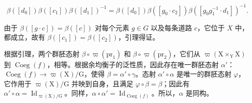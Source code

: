 \[
\beta ([ d _ {0} ]) \beta ([ c _ {1} ]) \beta ([ d _ {1} ]) ^ {- 1} = \beta ([ d _ {0} ]) \beta ([ g _ {0} \cdot c _ {2} ]) \beta ([ g _ {0} g _ {1} ^ {- 1} \cdot d _ {1} ]) ^ {- 1}.
\]

由于 \(\beta([g \cdot c]) = \beta([c])\) 对每个元素 \(g \in G\) 以及每条道路 \(c\)，它位于 \(X\) 中，都成立，故有 \(\beta([c_1]) = \beta([c_2])\)，引理得证。

根据引理，两个群胚态射 \(\beta \circ \varpi(\mathrm{pr}_{1})\) 和 \(\beta \circ \varpi(\mathrm{pr}_{2})\)，它们从 \(\varpi(\mathrm{X} \times_{\mathrm{Y}} \mathrm{X})\) 到 \(\operatorname{Coeg}(f)\)，相等。根据余均衡子的泛性质，因此存在唯一群胚态射 \(\alpha'\)：\(\operatorname{Coeg}(f) \to \varpi(\mathrm{X})/\mathrm{G}\)，使得 \(\beta = \alpha' \circ \gamma\)。态射 \(\alpha' \circ \alpha\) 是唯一的群胚态射 \(\varphi\)，它作用于 \(\varpi(\mathrm{X})/\mathrm{G}\) 并映到自身，且满足 \(\varphi \circ \beta = \beta\)；因此有 \(\alpha' \circ \alpha = \operatorname{Id}_{\varpi(\mathrm{X})/\mathrm{G}}\)。同样，\(\alpha \circ \alpha' = \operatorname{Id}_{\operatorname{Coeg}(f)}\)。所以，\(\alpha\) 是同构。

